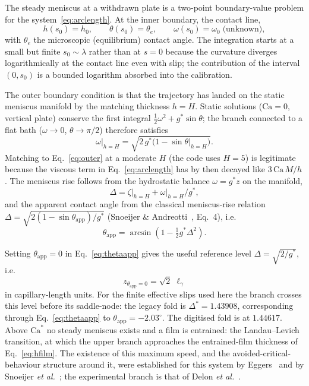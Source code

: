 \documentclass[11pt,a4paper]{article}
\newcommand{\Ca}{\mathrm{Ca}}
\newcommand{\lgamma}{\ell_\gamma}
\begin{document}
The steady meniscus at a withdrawn plate is a two-point boundary-value problem
for the system~\eqref{eq:arclength}. At the inner boundary, the contact line,
\begin{equation}
  h(s_0) = h_0, \qquad \theta(s_0) = \theta_e, \qquad
  \omega(s_0) = \omega_0 \;\text{(unknown)},
\end{equation}
with $\theta_e$ the microscopic (equilibrium) contact angle. The integration
starts at a small but finite $s_0 \sim \lambda$ rather than at $s = 0$ because
the curvature diverges logarithmically at the contact line even with slip; the
contribution of the interval $(0, s_0)$ is a bounded logarithm absorbed into
the calibration.

The outer boundary condition is that the trajectory has landed on the static
meniscus manifold by the matching thickness $h = H$. Static solutions
($\Ca = 0$, vertical plate) conserve the first integral
$\tfrac12\omega^{2} + g^{*}\sin\theta$; the branch connected to a flat bath
($\omega \to 0$, $\theta \to \pi/2$) therefore satisfies
\begin{equation}
  \omega\big|_{h=H} = \sqrt{2\,g^{*}\bigl(1 - \sin\theta\big|_{h=H}\bigr)}.
  \label{eq:outer}
\end{equation}
Matching to Eq.~\eqref{eq:outer} at a moderate $H$ (the code uses $H = 5$) is
legitimate because the viscous term in Eq.~\eqref{eq:arclength} has by then
decayed like $3\,\Ca\,M/h$. The meniscus rise follows from the hydrostatic
balance $\omega = g^{*} z$ on the manifold,
\begin{equation}
  \Delta = \zeta\big|_{h=H} + \omega\big|_{h=H}/g^{*},
  \label{eq:Delta}
\end{equation}
and the apparent contact angle from the classical meniscus-rise relation
$\Delta = \sqrt{2(1 - \sin\theta_{\mathrm{app}})/g^{*}}$
(Snoeijer \& Andreotti~\cite{snoeijer2013}, Eq.~4), i.e.
\begin{equation}
  \theta_{\mathrm{app}} = \arcsin\!\left(1 - \tfrac12 g^{*}\Delta^{2}\right).
  \label{eq:thetaapp}
\end{equation}

Setting $\theta_{\mathrm{app}} = 0$ in Eq.~\eqref{eq:thetaapp} gives the
useful reference level $\Delta = \sqrt{2/g^{*}}$, i.e.
\begin{equation}
  z_{\theta_{\mathrm{app}}=0} = \sqrt{2}\;\lgamma
\end{equation}
in capillary-length units. For the finite effective slips used here the branch
crosses this level before its saddle-node: the legacy fold is
$\Delta^{*}=1.43908$, corresponding through Eq.~\eqref{eq:thetaapp} to
$\theta_{\mathrm{app}}=-2.03^{\circ}$. The digitised fold is at $1.44617$.
Above $\Ca^{*}$ no steady meniscus exists and a film is entrained: the
Landau--Levich transition, at which the upper branch approaches the
entrained-film thickness of Eq.~\eqref{eq:hfilm}. The existence of this maximum
speed, and the avoided-critical-behaviour structure around it, were established
for this system by Eggers~\cite{eggers2004} and by Snoeijer \emph{et
al.}~\cite{snoeijer2006prl}; the experimental branch is that of Delon \emph{et
al.}~\cite{delon2008}.
\end{document}
